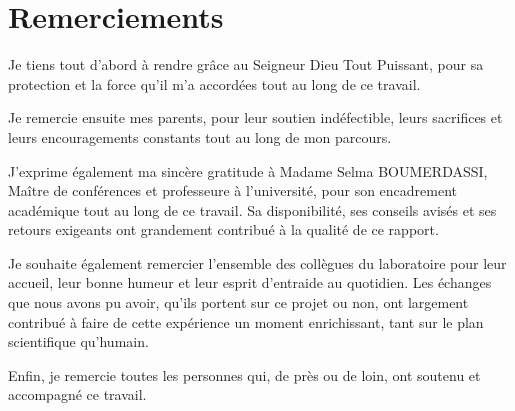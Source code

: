 \chapter*{Remerciements}

Je tiens tout d'abord à rendre grâce au Seigneur Dieu Tout Puissant, pour
sa protection et la force qu'il m'a accordées tout au long de ce travail.

Je remercie ensuite mes parents, pour leur soutien indéfectible, leurs
sacrifices et leurs encouragements constants tout au long de mon
parcours.

J'exprime également ma sincère gratitude à Madame Selma BOUMERDASSI,
Maître de conférences et professeure à l'université, pour son
encadrement académique tout au long de ce travail. Sa disponibilité,
ses conseils avisés et ses retours exigeants ont grandement contribué à
la qualité de ce rapport.

Je souhaite également remercier l'ensemble des collègues du laboratoire
pour leur accueil, leur bonne humeur et leur esprit d'entraide au
quotidien. Les échanges que nous avons pu avoir, qu'ils portent sur ce
projet ou non, ont largement contribué à faire de cette expérience un
moment enrichissant, tant sur le plan scientifique qu'humain.

Enfin, je remercie toutes les personnes qui, de près ou de loin, ont
soutenu et accompagné ce travail.
